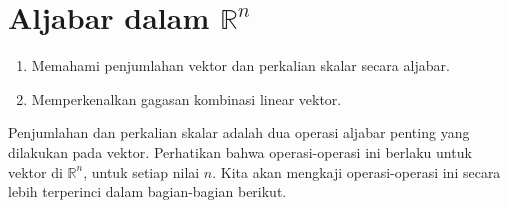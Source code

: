 \section{Aljabar dalam \texorpdfstring{$\mathbb{R}^{n}$}{Rn}}

\begin{outcome}
\begin{enumerate}
\item[A.] Memahami penjumlahan vektor dan perkalian skalar secara aljabar.
\item[B.] Memperkenalkan gagasan kombinasi linear vektor.
\end{enumerate}
\end{outcome}

Penjumlahan dan perkalian skalar adalah dua operasi aljabar penting yang dilakukan pada vektor. Perhatikan bahwa operasi-operasi ini
berlaku untuk vektor di $\mathbb{R}^{n}$, untuk setiap
nilai $n$. Kita akan mengkaji operasi-operasi ini secara lebih terperinci dalam bagian-bagian berikut.
